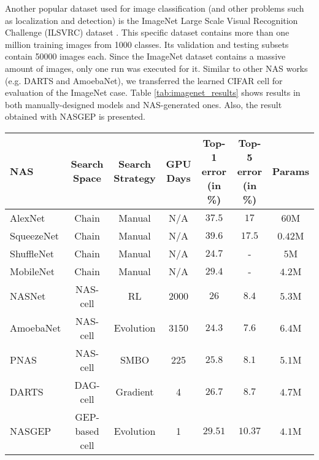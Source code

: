 \documentclass[conference]{IEEEtran}
\begin{document}
	Another popular dataset used for image classification (and other problems such as localization and detection) is the ImageNet Large Scale Visual Recognition Challenge (ILSVRC) dataset \cite{deng2009imagenet}.
	This specific dataset contains more than one million training images from 1000 classes.
	Its validation and testing subsets contain 50000 images each.
	Since the ImageNet dataset contains a massive amount of images, only one run was executed for it.
	Similar to other NAS works (e.g. DARTS and AmoebaNet), we transferred the learned CIFAR cell for evaluation of the ImageNet case.
	Table \ref{tab:imagenet_results} shows results in both manually-designed models and NAS-generated ones. 
	Also, the result obtained with NASGEP is presented.    
	
	\begin{table*}[htb]
		\centering
		\caption{Results from ImageNet dataset in mobile setting.}
		\label{tab:imagenet_results}{\begin{tabular}{@{}lcccccc@{}}
				\toprule
				\textbf{NAS} & \textbf{Search Space} & \textbf{Search Strategy} & \textbf{GPU Days} & \textbf{Top-1 error (in \%)} & \textbf{Top-5 error (in \%)} & \textbf{Params} \\ \midrule
				AlexNet \cite{krizhevsky2012imagenet} & Chain & Manual & N/A & $37.5$ & $17$ & $60$M \\
				SqueezeNet \cite{iandola2016squeezenet} & Chain & Manual & N/A & $39.6$ & $17.5$ & $0.42$M \\
				ShuffleNet \cite{zhang2018shufflenet} & Chain & Manual & N/A & $24.7$ & - & $5$M \\
				MobileNet \cite{howard2017mobilenets} & Chain & Manual & N/A & $29.4$ & - & $4.2$M \\ \midrule
				NASNet \cite{zoph2017learning} & NAS-cell & RL & 2000 & $26$ & $8.4$ & $5.3$M \\
				AmoebaNet \cite{real2018regularized} & NAS-cell & Evolution & 3150 & $24.3$ & $7.6$ & $6.4$M \\
				PNAS \cite{liu2017progressive} & NAS-cell & SMBO & 225 & $25.8$ & $8.1$ & $5.1$M  \\                
				DARTS \cite{liu2018darts} & DAG-cell & Gradient & 4 & $26.7$ & $8.7$ & $4.7$M \\ \midrule
				NASGEP & GEP-based cell & Evolution & 1 & $29.51$ & $10.37$ & $4.1$M \\ \bottomrule
			\end{tabular}}
	\end{table*}
	
\end{document}
